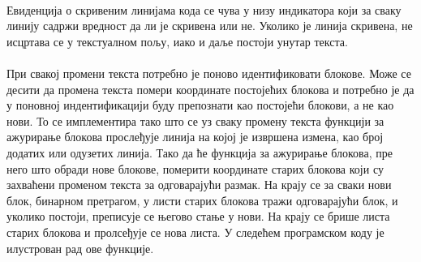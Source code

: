 \documentclass[12pt,oneside]{memoir}
\begin{document}
\paragraph{}
Евиденција о скривеним линијама кода се чува у низу индикатора који за сваку линију
садржи вредност да ли је скривена или не. Уколико је линија скривена, не исцртава
се у текстуалном пољу, иако и даље постоји унутар текста. 

\paragraph{}
При свакој промени текста потребно је поново идентификовати блокове. Може се десити
да промена текста помери координате постојећих блокова и потребно је да у поновној индентификацији буду препознати као постојећи блокови, а не као нови. То се имплементира тако што се
уз сваку промену текста функцији за ажурирање блокова прослеђује линија на којој је
извршена измена, као број додатих или одузетих линија. Тако да ће функција за
ажурирање блокова, пре него што обради нове блокове, померити координате старих блокова који су захваћени променом текста за одговарајући размак. На крају се за сваки нови
блок, бинарном претрагом, у листи старих блокова тражи одговарајући блок, и уколико постоји, преписује се његово стање у нови. На крају се брише листа старих блокова
и пролсеђује се нова листа. У следећем програмском коду је илустрован рад ове 
функције.
\end{document}
